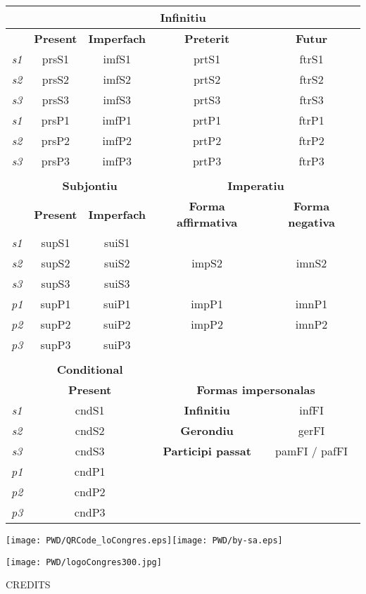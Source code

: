 \documentclass[10pt,a4paper,final]{article}
\begin{document}
\begin{tabular}{|c|c|c|c|c|}
\hline 
\multicolumn{5}{|c|}{\textbf{Infinitiu}} \\ 
\hline 
 & \textbf{Present} & \textbf{Imperfach} & \textbf{Preterit} & \textbf{Futur} \\ 
\hline 
\textit{s1} & prsS1 & imfS1 & prtS1 & ftrS1 \\ 
\hline 
\textit{s2} & prsS2 & imfS2 & prtS2 & ftrS2 \\ 
\hline 
\textit{s3} & prsS3 & imfS3 & prtS3 & ftrS3 \\ 
\hline 
\textit{s1} & prsP1 & imfP1 & prtP1 & ftrP1 \\ 
\hline 
\textit{s2} & prsP2 & imfP2 & prtP2 & ftrP2 \\ 
\hline 
\textit{s3} & prsP3 & imfP3 & prtP3 & ftrP3 \\ 
\hline 
\multicolumn{5}{|c|}{} \\ 
\hline 
 & \multicolumn{2}{c|}{\textbf{Subjontiu}}  & \multicolumn{2}{c|}{\textbf{Imperatiu}} \\ 
\hline 
 & \textbf{Present} & \textbf{Imperfach} & \textbf{Forma affirmativa} & \textbf{Forma negativa} \\ 
\hline 
\textit{s1} & supS1 & suiS1 & \multicolumn{2}{c|}{} \\ 
\hline 
\textit{s2} & supS2 & suiS2 & impS2 & imnS2 \\ 
\hline 
\textit{s3} & supS3 & suiS3 & \multicolumn{2}{c|}{} \\ 
\hline 
\textit{p1} & supP1 & suiP1 & impP1 & imnP1 \\ 
\hline 
\textit{p2} & supP2 & suiP2 & impP2 & imnP2 \\ 
\hline 
\textit{p3} & supP3 & suiP3 & \multicolumn{2}{c|}{} \\ 
\hline 
\multicolumn{5}{|c|}{} \\ 
\hline 
 & \multicolumn{2}{c|}{\textbf{Conditional}} & \multicolumn{2}{c|}{} \\ 
\hline 
 &  \multicolumn{2}{c|}{\textbf{Present}} & \multicolumn{2}{c|}{\textbf{Formas impersonalas}}  \\ 
\hline 
\textit{s1} & \multicolumn{2}{c|}{cndS1}  & \textbf{Infinitiu} & infFI \\ 
\hline 
\textit{s2} & \multicolumn{2}{c|}{cndS2}  & \textbf{Gerondiu} & gerFI \\ 
\hline 
\textit{s3} & \multicolumn{2}{c|}{cndS3}  & \textbf{Participi passat} & pamFI / pafFI \\ 
\hline 
\textit{p1} & \multicolumn{2}{c|}{cndP1} & \multicolumn{2}{c|}{} \\ 
\hline 
\textit{p2} & \multicolumn{2}{c|}{cndP2} & \multicolumn{2}{c|}{} \\ 
\hline 
\textit{p3} & \multicolumn{2}{c|}{cndP3} & \multicolumn{2}{c|}{} \\ 
\hline 
\end{tabular}

\texttt{[image: PWD/QRCode\_loCongres.eps]}\hfill\texttt{[image: PWD/by-sa.eps]}

\begin{center}
\texttt{[image: PWD/logoCongres300.jpg]}
\end{center}

\footnotesize{CREDITS}
\end{document}
